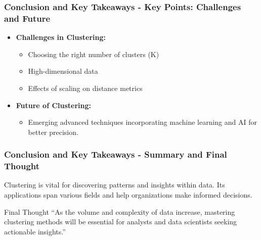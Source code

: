 \documentclass{beamer}
\begin{document}
\begin{frame}[fragile]
    \frametitle{Conclusion and Key Takeaways - Key Points: Challenges and Future}
    \begin{itemize}
        \item \textbf{Challenges in Clustering:}
        \begin{itemize}
            \item Choosing the right number of clusters (K)
            \item High-dimensional data
            \item Effects of scaling on distance metrics
        \end{itemize}
        
        \item \textbf{Future of Clustering:}
        \begin{itemize}
            \item Emerging advanced techniques incorporating machine learning and AI for better precision.
        \end{itemize}
    \end{itemize}
\end{frame}

\begin{frame}[fragile]
    \frametitle{Conclusion and Key Takeaways - Summary and Final Thought}
    Clustering is vital for discovering patterns and insights within data. Its applications span various fields and help organizations make informed decisions.
    
    \begin{block}{Final Thought}
        “As the volume and complexity of data increase, mastering clustering methods will be essential for analysts and data scientists seeking actionable insights.”
    \end{block}
\end{frame}
\end{document}
